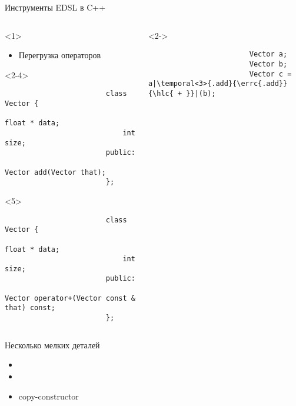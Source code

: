 \documentclass[aspectratio=169,14pt]{beamer}
\begin{document}
    \begin{frame}[fragile]{Инструменты EDSL в C++}
        \begin{columns}[T]
            \begin{column}{0.5\textwidth}
                \begin{onlyenv}<1>
                    \begin{itemize}
                        \item Перегрузка операторов
                    \end{itemize}
                \end{onlyenv}
                \begin{onlyenv}<2-4>
                    \begin{verbatim}
                        class Vector {
                            float * data;
                            int size;
                        public:
                            Vector add(Vector that);
                        };
                    \end{verbatim}
                \end{onlyenv}
                \begin{onlyenv}<5>
                    \begin{verbatim}
                        class Vector {
                            float * data;
                            int size;
                        public:
                            Vector operator+(Vector const & that) const;
                        };
                    \end{verbatim}
                \end{onlyenv}
            \end{column}
            \begin{column}{0.5\textwidth}
                \begin{onlyenv}<2->
                    \begin{verbatim}
                        Vector a;
                        Vector b;
                        Vector c = a|\temporal<3>{.add}{\errc{.add}}{\hlc{ + }}|(b);
                    \end{verbatim}
                \end{onlyenv}
        \end{column}
        \end{columns}
    \end{frame}

    \begin{frame}{Несколько мелких деталей}
        \begin{itemize}
            \item {}
            \item \code{&}
            \item copy-constructor
        \end{itemize}
    \end{frame}
\end{document}
